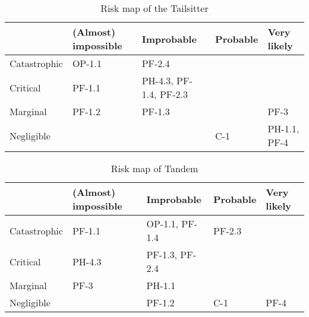 \begin{table}[H]
    \centering
    \caption{Risk map of the Tailsitter}
    \label{tab:risk_map_tail}
    \begin{tabular}{p{2.5cm}p{2.5cm}p{2.5cm}p{2.5cm}p{2.5cm}}
    \toprule
                    & (Almost) impossible           & Improbable                    & Probable                          & Very likely
    \\ \midrule
    Catastrophic    &\cellcolor[HTML]{d9ead3} OP-1.1      &\cellcolor[HTML]{fff2cc}  PF-2.4       &\cellcolor[HTML]{f4cccc}           &\cellcolor[HTML]{f4cccc}
    \\ \hdashline
    Critical        &\cellcolor[HTML]{d9ead3} PF-1.1      &\cellcolor[HTML]{fff2cc} PH-4.3, PF-1.4, PF-2.3      &\cellcolor[HTML]{fff2cc}           &\cellcolor[HTML]{f4cccc}
    \\ \hdashline
    Marginal        &\cellcolor[HTML]{d9ead3} PF-1.2      &\cellcolor[HTML]{d9ead3} PF-1.3      &\cellcolor[HTML]{fff2cc}           &\cellcolor[HTML]{fff2cc}  PF-3
    \\ \hdashline
    Negligible      &\cellcolor[HTML]{d9ead3}       &\cellcolor[HTML]{d9ead3}       &\cellcolor[HTML]{d9ead3}  C-1         &\cellcolor[HTML]{d9ead3} PH-1.1,  PF-4
    \\ \bottomrule
    \end{tabular}
\end{table}


\begin{table}[H]
    \centering
    \caption{Risk map of Tandem}
    \label{tab:risk_map_tand}
    \begin{tabular}{p{2.5cm}p{2.5cm}p{2.5cm}p{2.5cm}p{2.5cm}}
    \toprule
                    & (Almost) impossible           & Improbable                    & Probable                          & Very likely
    \\ \midrule
    Catastrophic    &\cellcolor[HTML]{d9ead3} PF-1.1       &\cellcolor[HTML]{fff2cc} OP-1.1,  PF-1.4      &\cellcolor[HTML]{f4cccc} PF-2.3          &\cellcolor[HTML]{f4cccc}
    \\ \hdashline
    Critical        &\cellcolor[HTML]{d9ead3} PH-4.3      &\cellcolor[HTML]{fff2cc} PF-1.3, PF-2.4      &\cellcolor[HTML]{fff2cc}           &\cellcolor[HTML]{f4cccc}
    \\ \hdashline
    Marginal        &\cellcolor[HTML]{d9ead3} PF-3      &\cellcolor[HTML]{d9ead3}  PH-1.1     &\cellcolor[HTML]{fff2cc}           &\cellcolor[HTML]{fff2cc}
    \\ \hdashline
    Negligible      &\cellcolor[HTML]{d9ead3}       &\cellcolor[HTML]{d9ead3}  PF-1.2     &\cellcolor[HTML]{d9ead3} C-1          &\cellcolor[HTML]{d9ead3} PF-4
    \\ \bottomrule
    \end{tabular}
\end{table}



